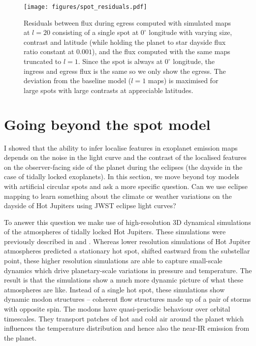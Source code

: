 \documentclass[12pt,dvipsnames]{report}
\begin{document}
\begin{figure}[t!]
    \begin{centering}
        \texttt{[image: figures/spot\_residuals.pdf]}
        \caption{
            Residuals between flux during egress computed with simulated maps at $l=20$ consisting of a single spot at
            $0^\circ$ longitude with varying size, contrast and latitude (while holding the planet to star
            dayside flux ratio constant at $0.001$), and the flux computed with the same maps truncated to
            $l=1$.
            Since the spot is always at $0^\circ$ longitude, the ingress and egress flux is the same
            so we only show the egress.
            The deviation from the baseline model ($l=1$ maps) is maximised for large spots with large
            contrasts at appreciable latitudes.
        }
        \label{fig:spot_residuals}
    \end{centering}
\end{figure}

\section{Going beyond the spot model}
\label{sec:exo_weather}
I showed that the ability to infer localise features in exoplanet emission maps 
depends on the noise in the light curve
and the contrast of the localised features on the observer-facing side of the planet 
during the eclipses (the dayside in the case of tidally locked exoplanets). In this 
section, we move beyond toy models with artificial circular spots and ask a more 
specific question. Can we use eclipse mapping to learn something about the climate
or weather variations on the dayside of Hot Jupiters using JWST eclipse light curves? 

To answer this question we make use of high-resolution 3D dynamical simulations of 
the atmospheres of tidally locked Hot Jupiters. These simulations were previously 
described in \citet{2022MNRAS.511.3584S} and \citet{2021ApJ...913L..32C}. 
Whereas lower resolution simulations of Hot Jupiter atmospheres predicted a stationary 
hot spot, shifted eastward from the substellar point, these higher resolution simulations
are able to capture small-scale dynamics which drive planetary-scale variations 
in pressure and temperature. The result is that the simulations show a much more 
dynamic picture of what these atmospheres are like. Instead of a single hot spot, 
these simulations show dynamic modon structures -- coherent flow structures made up of 
a pair of storms with opposite spin. The modons have quasi-periodic behaviour over 
orbital timescales. They transport patches of hot and cold air around the planet  
which influences the temperature distribution and hence also the near-IR emission 
from the planet.
\end{document}
